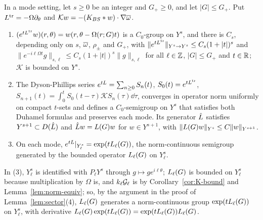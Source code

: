 \begin{lemma}
\label{lem:semigroup-construct}
In a mode setting, let $s\ge0$ be an integer and $G_+\ge0$, and let $|G|\le G_+$. Put
$L^{\rm tr}=-\Omega\partial_\theta$ and $\mathcal Kw=-(K_{BS}\ast w)\cdot\nabla\overline{\omega}$.
\begin{enumerate}[label=\textup{(\arabic*)}]
\item $(e^{tL^{\rm tr}}w)(r,\theta)=w(r,\theta-\Omega(r;G)t)$ is a $C_0$-group on $Y^s$,
  and there is $C_s$, depending only on $s$, $\overline{\omega}$, $\rho_\pm$ and $G_+$, with
  $\|e^{tL^{\rm tr}}\|_{Y^s\to Y^s}\le C_s(1+|t|)^s$ and
  $\|e^{-i\ell\Omega t}g\|_{s,\ell}\le C_s(1+|t|)^s\|g\|_{s,\ell}$ for all
  $\ell\in\mathbb{Z}$, $|G|\le G_+$ and $t\in\mathbb{R}$; $\mathcal K$ is bounded on $Y^s$.
\item The Dyson-Phillips series $e^{tL}=\sum_{n\ge0}S_n(t)$, $S_0(t)=e^{tL^{\rm tr}}$,
  $S_{n+1}(t)=\int_0^tS_0(t-\tau)\mathcal KS_n(\tau)\dd\tau$, converges in operator
  norm uniformly on compact $t$-sets and defines a $C_0$-semigroup on $Y^s$ that
  satisfies both Duhamel formulas and preserves each mode. Its generator
  $\hat{L}$ satisfies $Y^{s+1}\subset D(\hat{L})$ and $\hat{L} w=L(G)w$ for
  $w\in Y^{s+1}$, with $\|L(G)w\|_{Y^s}\le C\|w\|_{Y^{s+1}}$.
\item On each mode, $e^{tL}|_{Y^s_\ell}=\exp(tL_{\ell}(G))$, the norm-continuous
  semigroup generated by the bounded operator $L_{\ell}(G)$ on $Y^s_\ell$.
\end{enumerate}
\end{lemma}
In (3), $Y^s_\ell$ is identified with $P_\ell Y^s$ through $g\mapsto ge^{i\ell\theta}$;
$L_{\ell}(G)$ is bounded on $Y^s_\ell$ because multiplication by $\Omega$ is, and
$k_\ell\mathcal{G}_\ell$ is by Corollary~\ref{cor:K-bound} and
Lemma~\ref{lem:norm-equiv}; so, by the argument in the proof of
Lemma~\ref{lem:sector}(4), $L_{\ell}(G)$ generates a norm-continuous group
$\exp(tL_{\ell}(G))$ on $Y^s_\ell$, with derivative
$L_{\ell}(G)\exp(tL_{\ell}(G))=\exp(tL_{\ell}(G))L_{\ell}(G)$.
